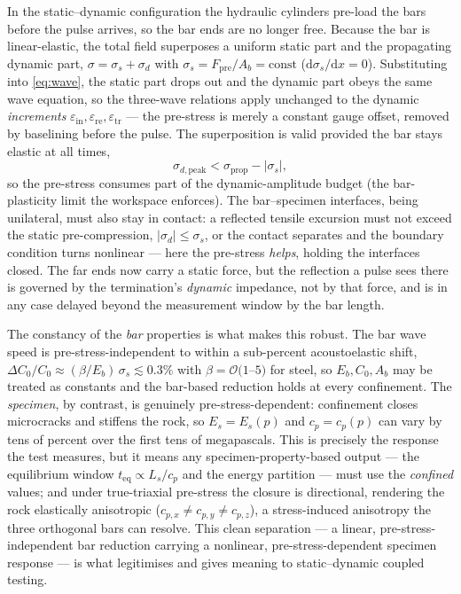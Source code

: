 \documentclass[11pt]{article}
\newcommand{\eps}{\varepsilon}
\begin{document}
In the static--dynamic configuration the hydraulic cylinders pre-load the bars
before the pulse arrives, so the bar ends are no longer free. Because the bar is
linear-elastic, the total field superposes a uniform static part and the
propagating dynamic part, $\sigma=\sigma_s+\sigma_d$ with
$\sigma_s=F_{\mathrm{pre}}/A_b=\mathrm{const}$ ($\mathrm{d}\sigma_s/\mathrm{d}x=0$).
Substituting into \eqref{eq:wave}, the static part drops out and the dynamic part
obeys the same wave equation, so the three-wave relations apply unchanged to the
dynamic \emph{increments} $\eps_{\mathrm{in}},\eps_{\mathrm{re}},\eps_{\mathrm{tr}}$
--- the pre-stress is merely a constant gauge offset, removed by baselining before
the pulse. The superposition is valid provided the bar stays elastic at all times,
\begin{equation}
\sigma_{d,\mathrm{peak}}<\sigma_{\mathrm{prop}}-|\sigma_s|,
\label{eq:budget}
\end{equation}
so the pre-stress consumes part of the dynamic-amplitude budget (the bar-plasticity
limit the workspace enforces). The bar--specimen interfaces, being unilateral, must
also stay in contact: a reflected tensile excursion must not exceed the static
pre-compression, $|\sigma_d|\le\sigma_s$, or the contact separates and the boundary
condition turns nonlinear --- here the pre-stress \emph{helps}, holding the
interfaces closed. The far ends now carry a static force, but the reflection a pulse
sees there is governed by the termination's \emph{dynamic} impedance, not by that
force, and is in any case delayed beyond the measurement window by the bar length.

The constancy of the \emph{bar} properties is what makes this robust. The bar wave
speed is pre-stress-independent to within a sub-percent acoustoelastic shift,
$\Delta C_0/C_0\approx(\beta/E_b)\,\sigma_s\lesssim0.3\%$ with
$\beta=\mathcal{O}(1$--$5)$ for steel, so $E_b,C_0,A_b$ may be treated as constants
and the bar-based reduction holds at every confinement. The \emph{specimen}, by
contrast, is genuinely pre-stress-dependent: confinement closes microcracks and
stiffens the rock, so $E_s=E_s(p)$ and $c_p=c_p(p)$ can vary by tens of percent
over the first tens of megapascals. This is precisely the response the test
measures, but it means any specimen-property-based output --- the equilibrium window
$t_{\mathrm{eq}}\propto L_s/c_p$ and the energy partition --- must
use the \emph{confined} values; and under true-triaxial pre-stress the closure is
directional, rendering the rock elastically anisotropic
($c_{p,x}\neq c_{p,y}\neq c_{p,z}$), a stress-induced anisotropy the three
orthogonal bars can resolve. This clean separation --- a linear,
pre-stress-independent bar reduction carrying a nonlinear, pre-stress-dependent
specimen response --- is what legitimises and gives meaning to static--dynamic
coupled testing.
\end{document}
